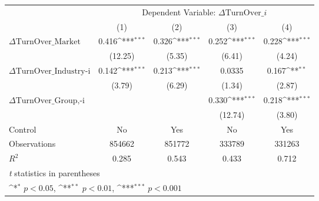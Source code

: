 {
\def\sym#1{\ifmmode^{#1}\else\(^{#1}\)\fi}
\begin{tabular}{l*{4}{c}}
\hline\hline
                    &\multicolumn{4}{c}{Dependent Variable: $\Delta \text{TurnOver}\_{i} $ }                 \\\cmidrule(lr){2-5}
                    &\multicolumn{1}{c}{(1)}         &\multicolumn{1}{c}{(2)}         &\multicolumn{1}{c}{(3)}         &\multicolumn{1}{c}{(4)}         \\
\hline
 $ \Delta \text{TurnOver}\_{\text{Market}} $ &       0.416\sym{***}&       0.326\sym{***}&       0.252\sym{***}&       0.228\sym{***}\\
                    &     (12.25)         &      (5.35)         &      (6.41)         &      (4.24)         \\
[1em]
 $ \Delta \text{TurnOver}\_{\text{Industry-i}} $ &       0.142\sym{***}&       0.213\sym{***}&      0.0335         &       0.167\sym{**} \\
                    &      (3.79)         &      (6.29)         &      (1.34)         &      (2.87)         \\
[1em]
 $ \Delta \text{TurnOver}\_{\text{Group,-i}} $ &                     &                     &       0.330\sym{***}&       0.218\sym{***}\\
                    &                     &                     &     (12.74)         &      (3.80)         \\
\hline
Control             &          No         &         Yes         &          No         &         Yes         \\
Observations        &      854662         &      851772         &      333789         &      331263         \\
$ R^2 $             &       0.285         &       0.543         &       0.433         &       0.712         \\
\hline\hline
\multicolumn{5}{l}{\footnotesize \textit{t} statistics in parentheses}\\
\multicolumn{5}{l}{\footnotesize \sym{*} \(p<0.05\), \sym{**} \(p<0.01\), \sym{***} \(p<0.001\)}\\
\end{tabular}
}

